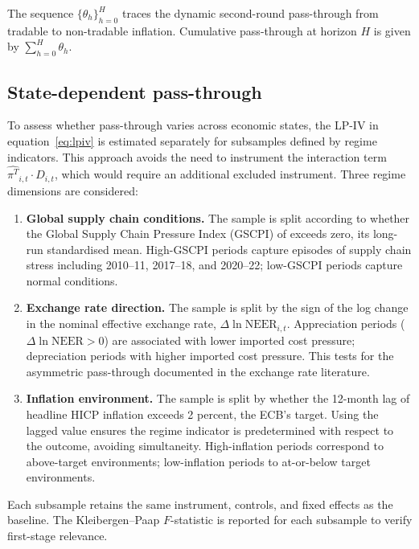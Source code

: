 \documentclass[11pt]{article}
\begin{document}
The sequence $\{\theta_h\}_{h=0}^{H}$ traces the dynamic second-round pass-through from tradable to non-tradable inflation. Cumulative pass-through at horizon $H$ is given by $\sum_{h=0}^{H} \theta_h$.

\subsection{State-dependent pass-through}

To assess whether pass-through varies across economic states, the LP-IV in equation~\eqref{eq:lpiv} is estimated separately for subsamples defined by regime indicators. This approach avoids the need to instrument the interaction term $\widehat{\pi^T}_{i,t} \cdot D_{i,t}$, which would require an additional excluded instrument. Three regime dimensions are considered:

\begin{enumerate}
  \item \textbf{Global supply chain conditions.} The sample is split according to whether the Global Supply Chain Pressure Index (GSCPI) of \citet{benigno2022global} exceeds zero, its long-run standardised mean. High-GSCPI periods capture episodes of supply chain stress including 2010--11, 2017--18, and 2020--22; low-GSCPI periods capture normal conditions.

  \item \textbf{Exchange rate direction.} The sample is split by the sign of the log change in the nominal effective exchange rate, $\Delta \ln \mathrm{NEER}_{i,t}$. Appreciation periods ($\Delta \ln \mathrm{NEER} > 0$) are associated with lower imported cost pressure; depreciation periods with higher imported cost pressure. This tests for the asymmetric pass-through documented in the exchange rate literature.

  \item \textbf{Inflation environment.} The sample is split by whether the 12-month lag of headline HICP inflation exceeds 2 percent, the ECB's target. Using the lagged value ensures the regime indicator is predetermined with respect to the outcome, avoiding simultaneity. High-inflation periods correspond to above-target environments; low-inflation periods to at-or-below target environments.
\end{enumerate}

Each subsample retains the same instrument, controls, and fixed effects as the baseline. The Kleibergen--Paap $F$-statistic is reported for each subsample to verify first-stage relevance.
\end{document}
